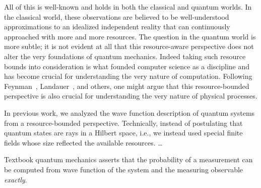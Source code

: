 \documentclass[reprint, aps, prl,superscriptaddress, showpacs,
showkeys]{revtex4-1}
\theoremstyle{plain}
\theoremstyle{definition}
\begin{document}
All of this is well-known and holds in both the classical and quantum
worlds. In the classical world, these observations are believed to be
well-understood approximations to an idealized independent reality
that can continuously approached with more and more resources. The
question in the quantum world is more subtle; it is not evident at all
that this resource-aware perspective does not alter the very
foundations of quantum mechanics. Indeed taking such resource bounds
into consideration is what founded computer science as a discipline
and has become crucial for understanding the very nature of
computation. Following Feynman~\cite{Feynman1982Simulating},
Landauer~\cite{Landauer1996188}, and others, one might argue that this
resource-bounded perspective is also crucial for understanding the
very nature of physical processes.

In previous work, we analyzed the wave function description of quantum
systems from a resource-bounded perspective. Technically, instead of
postulating that quantum states are rays in a Hilbert space, i.e., we
instead used special finite fields whose size reflected the available
resources. \ldots

\newpage

Textbook quantum mechanics asserts that the probability of a measurement
can be computed from wave function of the system and the measuring
observable \emph{exactly}.
\end{document}
